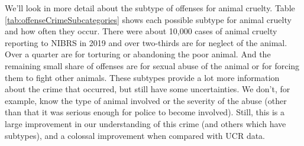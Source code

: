 \documentclass[
  12pt,
  openany]{book}
\begin{document}
We'll look in more detail about the subtype of offenses for animal cruelty. Table \ref{tab:offenseCrimeSubcategories} shows each possible subtype for animal cruelty and how often they occur. There were about 10,000 cases of animal cruelty reporting to NIBRS in 2019 and over two-thirds are for neglect of the animal. Over a quarter are for torturing or abandoning the poor animal. And the remaining small share of offenses are for sexual abuse of the animal or for forcing them to fight other animals. These subtypes provide a lot more information about the crime that occurred, but still have some uncertainties. We don't, for example, know the type of animal involved or the severity of the abuse (other than that it was serious enough for police to become involved). Still, this is a large improvement in our understanding of this crime (and others which have subtypes), and a colossal improvement when compared with UCR data.
\end{document}
